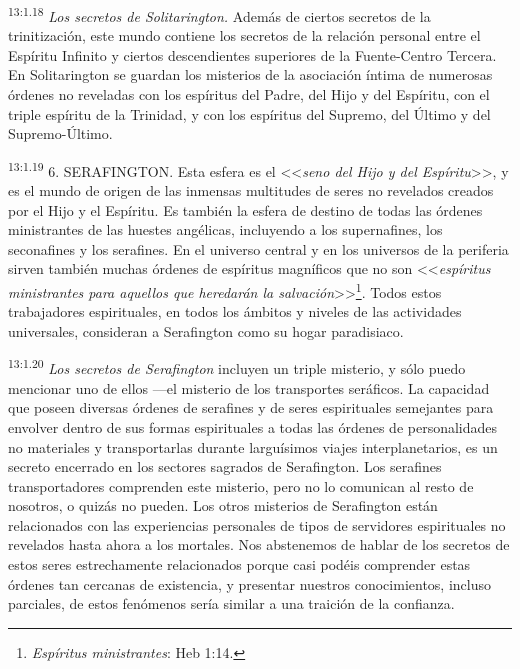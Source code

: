 \par
\textsuperscript{13:1.18} \textit{Los secretos de Solitarington.} Además de ciertos secretos de la trinitización, este mundo contiene los secretos de la relación personal entre el Espíritu Infinito y ciertos descendientes superiores de la Fuente-Centro Tercera. En Solitarington se guardan los misterios de la asociación íntima de numerosas órdenes no reveladas con los espíritus del Padre, del Hijo y del Espíritu, con el triple espíritu de la Trinidad, y con los espíritus del Supremo, del Último y del Supremo-Último.

\par
\textsuperscript{13:1.19} 6. SERAFINGTON. Esta esfera es el <<\textit{seno del Hijo y del Espíritu}>>, y es el mundo de origen de las inmensas multitudes de seres no revelados creados por el Hijo y el Espíritu. Es también la esfera de destino de todas las órdenes ministrantes de las huestes angélicas, incluyendo a los supernafines, los seconafines y los serafines. En el universo central y en los universos de la periferia sirven también muchas órdenes de espíritus magníficos que no son <<\textit{espíritus ministrantes para aquellos que heredarán la salvación}>>\footnote{\textit{Espíritus ministrantes}: Heb 1:14.}. Todos estos trabajadores espirituales, en todos los ámbitos y niveles de las actividades universales, consideran a Serafington como su hogar paradisiaco.

\par
\textsuperscript{13:1.20} \textit{Los secretos de Serafington} incluyen un triple misterio, y sólo puedo mencionar uno de ellos ---el misterio de los transportes seráficos. La capacidad que poseen diversas órdenes de serafines y de seres espirituales semejantes para envolver dentro de sus formas espirituales a todas las órdenes de personalidades no materiales y transportarlas durante larguísimos viajes interplanetarios, es un secreto encerrado en los sectores sagrados de Serafington. Los serafines transportadores comprenden este misterio, pero no lo comunican al resto de nosotros, o quizás no pueden. Los otros misterios de Serafington están relacionados con las experiencias personales de tipos de servidores espirituales no revelados hasta ahora a los mortales. Nos abstenemos de hablar de los secretos de estos seres estrechamente relacionados porque casi podéis comprender estas órdenes tan cercanas de existencia, y presentar nuestros conocimientos, incluso parciales, de estos fenómenos sería similar a una traición de la confianza.

